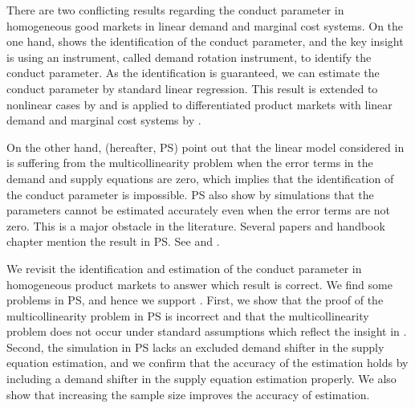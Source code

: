 \documentclass[11pt, a4paper]{article}
\begin{document}
There are two conflicting results regarding the conduct parameter in homogeneous good markets in linear demand and marginal cost systems.
On the one hand, \citet{bresnahan1982oligopoly} shows the identification of the conduct parameter, and the key insight is using an instrument, called demand rotation instrument, to identify the conduct parameter.
As the identification is guaranteed, we can estimate the conduct parameter by standard linear regression.
This result is extended to nonlinear cases by \citet{lau1982identifying}
and is applied to differentiated product markets with linear demand and marginal cost systems by  \citet{nevoIdentificationOligopolySolution1998}.

On the other hand, \citet{perloff2012collinearity} (hereafter, PS) point out that the linear model considered in \citet{bresnahan1982oligopoly} is suffering from the multicollinearity problem when the error terms in the demand and supply equations are zero, which implies that the identification of the conduct parameter is impossible.
PS also show by simulations that the parameters cannot be estimated accurately even when the error terms are not zero. 
This is a major obstacle in the literature. 
Several papers and handbook chapter mention the result in PS. See \citet{claessensWhatDrivesBank2004, coccoreseMultimarketContactCompetition2013, coccoreseWhatAffectsBank2021, garciaMarketStructuresProduction2020, kumbhakarNewMethodEstimating2012, perekhozhukRegionalLevelAnalysisOligopsony2015} and \citet{shafferMarketPowerCompetition2017}.

We revisit the identification and estimation of the conduct parameter in homogeneous product markets to answer which result is correct.
We find some problems in PS, and hence we support \cite{bresnahan1982oligopoly}.
First, we show that the proof of the multicollinearity problem in PS is incorrect and that the multicollinearity problem does not occur under standard assumptions which reflect the insight in \citet{bresnahan1982oligopoly}.
Second, the simulation in PS lacks an excluded demand shifter in the supply equation estimation, and we confirm that the accuracy of the estimation holds by including a demand shifter in the supply equation estimation properly. 
We also show that increasing the sample size improves the accuracy of estimation.






\end{document}
